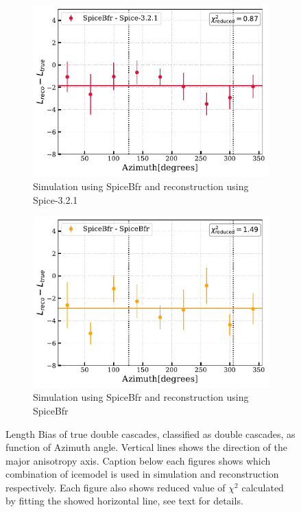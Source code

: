 \begin{figure}[hbt!]
\medskip %
\begin{subfigure}{.7\textwidth}
    \includegraphics[width=\linewidth]{./figures/EventSample/Lbias_bfrspice.pdf}
    \caption{Simulation using SpiceBfr and reconstruction using Spice-3.2.1}
\end{subfigure}\hfill %
\begin{subfigure}{.7\textwidth}
    \includegraphics[width=\linewidth]{./figures/EventSample/Lbias_bfrbfr.pdf}
    \caption{Simulation using SpiceBfr and reconstruction using SpiceBfr}
\end{subfigure}

\caption{Length Bias of true double cascades, classified as double cascades, as function of Azimuth angle. Vertical lines shows the direction of the major anisotropy axis. Caption below each figures shows which combination of icemodel is used in simulation and reconstruction respectively. Each figure also shows reduced value of $\chi^2$ calculated by fitting the showed horizontal line, see text for details.}
\end{figure}


